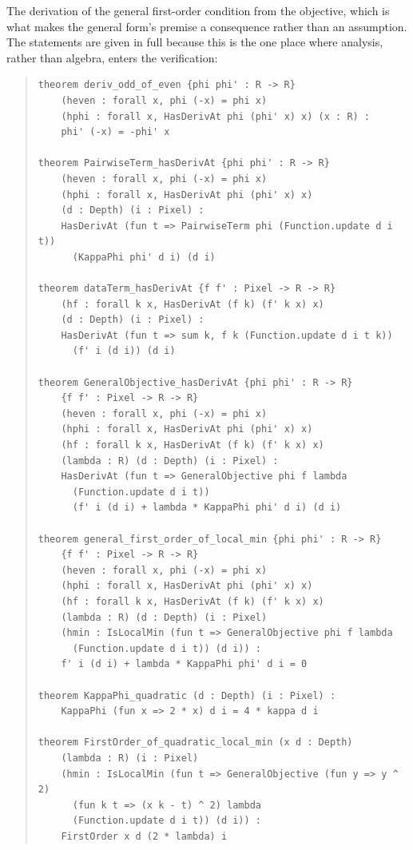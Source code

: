 The derivation of the general first-order condition from the objective, which is what makes the general form's premise a consequence rather than an assumption. The statements are given in full because this is the one place where analysis, rather than algebra, enters the verification:
\begin{quote}
\small
\begin{verbatim}
theorem deriv_odd_of_even {phi phi' : R -> R}
    (heven : forall x, phi (-x) = phi x)
    (hphi : forall x, HasDerivAt phi (phi' x) x) (x : R) :
    phi' (-x) = -phi' x

theorem PairwiseTerm_hasDerivAt {phi phi' : R -> R}
    (heven : forall x, phi (-x) = phi x)
    (hphi : forall x, HasDerivAt phi (phi' x) x)
    (d : Depth) (i : Pixel) :
    HasDerivAt (fun t => PairwiseTerm phi (Function.update d i t))
      (KappaPhi phi' d i) (d i)

theorem dataTerm_hasDerivAt {f f' : Pixel -> R -> R}
    (hf : forall k x, HasDerivAt (f k) (f' k x) x)
    (d : Depth) (i : Pixel) :
    HasDerivAt (fun t => sum k, f k (Function.update d i t k))
      (f' i (d i)) (d i)

theorem GeneralObjective_hasDerivAt {phi phi' : R -> R}
    {f f' : Pixel -> R -> R}
    (heven : forall x, phi (-x) = phi x)
    (hphi : forall x, HasDerivAt phi (phi' x) x)
    (hf : forall k x, HasDerivAt (f k) (f' k x) x)
    (lambda : R) (d : Depth) (i : Pixel) :
    HasDerivAt (fun t => GeneralObjective phi f lambda
      (Function.update d i t))
      (f' i (d i) + lambda * KappaPhi phi' d i) (d i)

theorem general_first_order_of_local_min {phi phi' : R -> R}
    {f f' : Pixel -> R -> R}
    (heven : forall x, phi (-x) = phi x)
    (hphi : forall x, HasDerivAt phi (phi' x) x)
    (hf : forall k x, HasDerivAt (f k) (f' k x) x)
    (lambda : R) (d : Depth) (i : Pixel)
    (hmin : IsLocalMin (fun t => GeneralObjective phi f lambda
      (Function.update d i t)) (d i)) :
    f' i (d i) + lambda * KappaPhi phi' d i = 0

theorem KappaPhi_quadratic (d : Depth) (i : Pixel) :
    KappaPhi (fun x => 2 * x) d i = 4 * kappa d i

theorem FirstOrder_of_quadratic_local_min (x d : Depth)
    (lambda : R) (i : Pixel)
    (hmin : IsLocalMin (fun t => GeneralObjective (fun y => y ^ 2)
      (fun k t => (x k - t) ^ 2) lambda
      (Function.update d i t)) (d i)) :
    FirstOrder x d (2 * lambda) i
\end{verbatim}
\end{quote}

